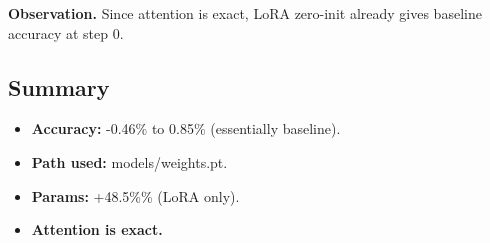 \textbf{Observation.} Since attention is exact, LoRA zero-init already gives 
baseline accuracy at step 0.

\subsection{Summary}

\begin{itemize}
\item \textbf{Accuracy:} -0.46\% to 0.85\% (essentially baseline).
\item \textbf{Path used:} models/weights.pt.
\item \textbf{Params:} +48.5\%\% (LoRA only).
\item \textbf{Attention is exact.}

\end{itemize}
